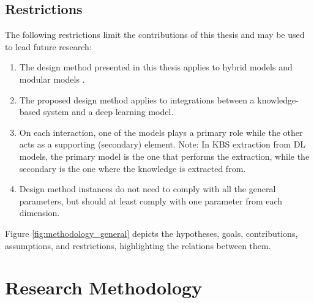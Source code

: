 \subsection{Restrictions}
The following restrictions limit the contributions of this thesis and may be used to lead future research:
\begin{enumerate}[start=1,label={\bfseries R\arabic*:}]
    \item The design method presented in this thesis applies to hybrid models \citep{hilario_overview_nodate} and modular models \citep{mcgarry_hybrid_1999}.
    \item The proposed design method applies to integrations between a knowledge-based system and a deep learning model. 
    \item On each interaction, one of the models plays a primary role while the other acts as a supporting (secondary) element. Note: In KBS extraction from DL models, the primary model is the one that performs the extraction, while the secondary is the one where the knowledge is extracted from.
    \item Design method instances do not need to comply with all the general parameters, but should at least comply with one parameter from each dimension. 
\end{enumerate}

Figure \ref{fig:methodology_general} depicts the hypotheses, goals, contributions, assumptions, and restrictions, highlighting the relations between them. 

\section{Research Methodology}\label{3_sec:research_methodology}

